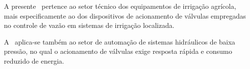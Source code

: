 

\pnum A presente \nomedanatureza\ pertence ao setor técnico dos equipamentos de
irrigação agrícola, mais especificamente ao dos dispositivos de acionamento de
válvulas empregadas no controle de vazão em sistemas de irrigação localizada.

\pnum A \nomedanatureza\ aplica-se também ao setor de automação de sistemas
hidráulicos de baixa pressão, no qual o acionamento de válvulas exige resposta
rápida e consumo reduzido de energia.
